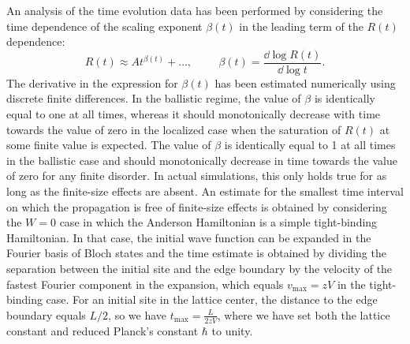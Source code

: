 \documentclass[10pt,a4paper]{article}
\begin{document}
An analysis of the time evolution data has been performed by considering the time dependence of the scaling exponent $\beta(t)$ in the leading term of the $R(t)$ dependence:
\begin{equation}\label{eq:beta_time}
R(t)\approx At^{\beta(t)}+\dots, \hspace{1cm} \beta(t)=\frac{\dd \log R(t)}{\dd \log t}.
\end{equation}
The derivative in the expression for $\beta(t)$ has been estimated numerically using discrete finite differences. In the ballistic regime, the value of $\beta$ is identically equal to one at all times, whereas it should monotonically decrease with time towards the value of zero in the localized case when the saturation of $R(t)$ at some finite value is expected.  
\noindent 
The value of $\beta$ is identically equal to 1 at all times in the ballistic case and should monotonically decrease in time towards the value of zero for any finite disorder. In actual simulations, this only holds true for as long as the finite-size effects are absent. An estimate for the smallest time interval on which the propagation is free of finite-size effects is obtained by considering the $W=0$ case in which the Anderson Hamiltonian is a simple tight-binding Hamiltonian. In that case, the initial wave function can be expanded in the Fourier basis of Bloch states and the time estimate is obtained by dividing the separation between the initial site and the edge boundary by the velocity of the fastest Fourier component in the expansion, which equals $v_\mathrm{max}=zV$ in the tight-binding case. For an initial site in the lattice center, the distance to the edge boundary equals $L/2$, so we have $t_\mathrm{max}=\frac{L}{2zV}$, where we have set both the lattice constant and reduced Planck's constant $\hbar$ to unity.
\end{document}

